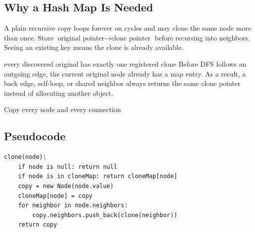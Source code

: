 \subsection{Why a Hash Map Is Needed}
A plain recursive copy loops forever on cycles and may clone the same node more
than once. Store \(\text{original pointer}\rightarrow\text{clone pointer}\)
before recursing into neighbors. Seeing an existing key means the clone
is already available.

\begin{invariantbox}{every discovered original has exactly one registered clone}
Before DFS follows an outgoing edge, the current original node already has a
map entry. As a result, a back edge, self-loop, or shared neighbor always
returns the same clone pointer instead of allocating another object.
\end{invariantbox}

\begin{visualbox}{Copy every node and every connection}
\centering
{}
\end{visualbox}

\subsection{Pseudocode}
\begin{lstlisting}[style=pseudocode]
clone(node):
    if node is null: return null
    if node is in cloneMap: return cloneMap[node]
    copy = new Node(node.value)
    cloneMap[node] = copy
    for neighbor in node.neighbors:
        copy.neighbors.push_back(clone(neighbor))
    return copy
\end{lstlisting}

